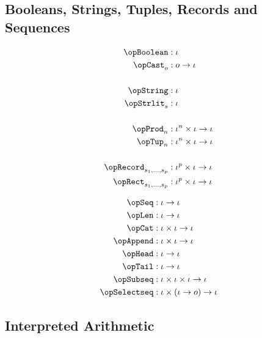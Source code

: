 \documentclass[11pt, a4paper, oneside]{article}
\begin{document}
    \subsection{Booleans, Strings, Tuples, Records and Sequences}

\begin{minipage}[t]{.5\textwidth}
    \begin{align*}
        \opBoolean      &: \idv \\
        \opCast_o       &: o \arr \idv \\
        \\
        \opString       &: \idv \\
        \opStrlit_s     &: \idv \\
        \\
        \opProd_n       &: \idv^n \times \idv \arr \idv \\
        \opTup_n        &: \idv^n \times \idv \arr \idv \\
        \\
        \opRecord_{s_1,\dots,s_p} &: \idv^p \times \idv \arr \idv \\
        \opRect_{s_1,\dots,s_p}   &: \idv^p \times \idv \arr \idv \\
    \end{align*}
\end{minipage}%
\begin{minipage}[t]{.5\textwidth}
    \begin{align*}
        \opSeq          &: \idv \arr \idv \\
        \opLen          &: \idv \arr \idv \\
        \opCat          &: \idv \times \idv \arr \idv \\
        \opAppend       &: \idv \times \idv \arr \idv \\
        \opHead         &: \idv \arr \idv \\
        \opTail         &: \idv \arr \idv \\
        \opSubseq       &: \idv \times \idv \times \idv \arr \idv \\
        \opSelectseq    &: \idv \times (\idv \arr o) \arr \idv
    \end{align*}
\end{minipage}


    \subsection{Interpreted Arithmetic}
\end{document}
